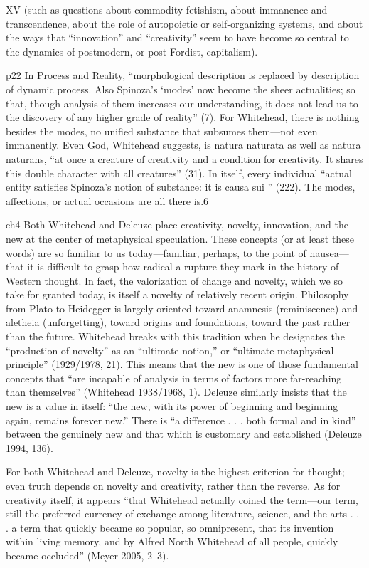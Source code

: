XV
(such as questions about commodity fetishism, about immanence
and transcendence, about the role of autopoietic or self-organizing systems,
and about the ways that “innovation” and “creativity” seem to have
become so central to the dynamics of postmodern, or post-Fordist, capitalism).

p22
In Process and Reality, “morphological description is replaced by
description of dynamic process. Also Spinoza’s ‘modes’ now become the
sheer actualities; so that, though analysis of them increases our understanding,
it does not lead us to the discovery of any higher grade of reality” (7).
For Whitehead, there is nothing besides the modes, no unified substance
that subsumes them—not even immanently. Even God, Whitehead suggests,
is natura naturata as well as natura naturans, “at once a creature of creativity
and a condition for creativity. It shares this double character with all creatures”
(31). In itself, every individual “actual entity satisfies Spinoza’s notion
of substance: it is causa sui ” (222). The modes, affections, or actual occasions
are all there is.6

ch4	
Both Whitehead and Deleuze place creativity, novelty, innovation, and the
new at the center of metaphysical speculation. These concepts (or at least these
words) are so familiar to us today—familiar, perhaps, to the point of nausea—
that it is difficult to grasp how radical a rupture they mark in the history of
Western thought. In fact, the valorization of change and novelty, which we so
take for granted today, is itself a novelty of relatively recent origin. Philosophy
from Plato to Heidegger is largely oriented toward anamnesis (reminiscence)
and aletheia (unforgetting), toward origins and foundations, toward the past
rather than the future. Whitehead breaks with this tradition when he designates
the “production of novelty” as an “ultimate notion,” or “ultimate metaphysical
principle” (1929/1978, 21). This means that the new is one of those
fundamental concepts that “are incapable of analysis in terms of factors more
far-reaching than themselves” (Whitehead 1938/1968, 1). Deleuze similarly
insists that the new is a value in itself: “the new, with its power of beginning
and beginning again, remains forever new.” There is “a difference . . . both formal
and in kind” between the genuinely new and that which is customary and
established (Deleuze 1994, 136).

For both Whitehead and Deleuze, novelty is the highest
criterion for thought; even truth depends on novelty and creativity, rather than
the reverse. As for creativity itself, it appears “that Whitehead actually coined
the term—our term, still the preferred currency of exchange among literature,
science, and the arts . . . a term that quickly became so popular, so omnipresent,
that its invention within living memory, and by Alfred North Whitehead of
all people, quickly became occluded” (Meyer 2005, 2–3).

